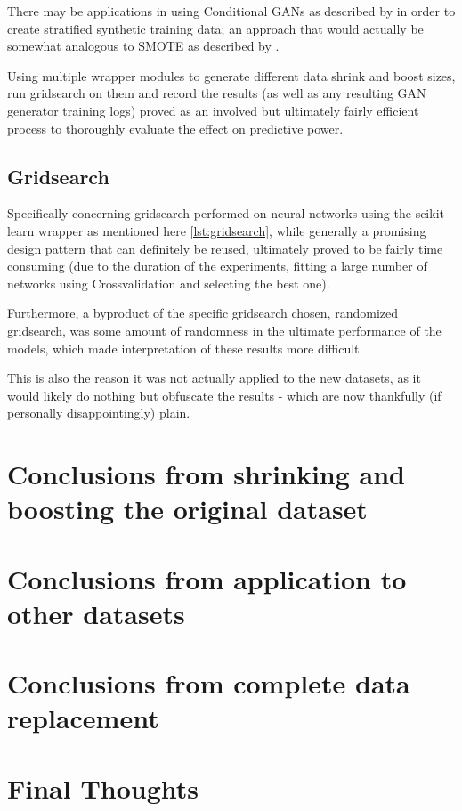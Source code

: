 There may be applications in using Conditional \acp{GAN} as described by \cite{conditional_gans} in order to create stratified synthetic training data; an approach that would actually be somewhat analogous to \ac{SMOTE} as described by \cite{smote}.

Using multiple wrapper modules to generate different data shrink and boost sizes, run gridsearch on them and record the results (as well as any resulting \ac{GAN} generator training logs) proved as an involved but ultimately fairly efficient process to thoroughly evaluate the effect on predictive power.

\pagebreak

\subsection{Gridsearch}

Specifically concerning gridsearch performed on neural networks using the scikit-learn wrapper as mentioned here \ref{lst:gridsearch}, while generally a promising design pattern that can definitely be reused, ultimately proved to be fairly time consuming (due to the duration of the experiments, fitting a large number of networks using Crossvalidation and selecting the best one). 

Furthermore, a byproduct of the specific gridsearch chosen, randomized gridsearch, was some amount of randomness in the ultimate performance of the models, which made interpretation of these results more difficult. 

This is also the reason it was not actually applied to the new datasets, as it would likely do nothing but obfuscate the results - which are now thankfully (if personally disappointingly) plain.

\pagebreak

\section{Conclusions from shrinking and boosting the original dataset}

\pagebreak

\section{Conclusions from application to other datasets}

\pagebreak

\section{Conclusions from complete data replacement}

\cite{ares_utility}

\pagebreak

\section{Final Thoughts}

\pagebreak
